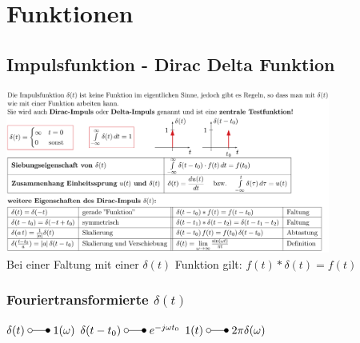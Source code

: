 \section{Funktionen}
	\subsection{Impulsfunktion - Dirac Delta Funktion}
		\includegraphics[width=0.8\textwidth]{./bilder/funktionen/impulsF.png}\\
        
        Bei einer Faltung mit einer $\delta\left(t\right)$ Funktion
        gilt: $f\left(t\right) \ast \delta\left(t\right) = f\left(t\right)$
	
	\subsubsection{Fouriertransformierte $\delta(t)$}
		$\delta(t) \; \laplace \; 1(\omega)$ \qquad
		$\delta(t-t_0) \; \laplace \; e^{-j\omega t_0}$ \qquad
		$1(t) \; \laplace \; 2\pi \delta(\omega)$



